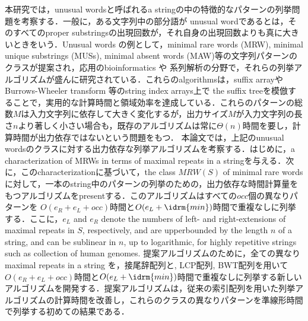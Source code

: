 
本研究では，unusual wordsと呼ばれるa stringの中の特徴的なパターンの列挙問題を考察する．一般に，ある文字列中の部分語が unusual wordであるとは，そのすべてのproper substringsの出現回数が，それ自身の出現回数よりも真に大きいときをいう．Unusual words の例として，minimal rare words (MRW), minimal unique substrings (MUSs), minimal absent words (MAW)等の文字列パターンのクラスが提案され，応用のbioinformatics や 系列解析の分野で，それらの列挙アルゴリズムが盛んに研究されている．これらのalgorithmsは，suffix arrayやBurrows-Wheeler transform 等のstring index arrays上で the suffix treeを模倣することで，実用的な計算時間と領域効率を達成している．これらのパターンの総数$M$は入力文字列に依存して大きく変化するが，出力サイズ$M$が入力文字列の長さ$n$より著しく小さい場合も，既存のアルゴリズムは常に$\Theta(n)$時間を要し，計算時間が出力依存ではないという問題をもつ．
本論文では，上記のunusual wordsのクラスに対する出力依存な列挙アルゴリズムを考察する．はじめに，a characterization of MRWs in terms of maximal repeats in a stringを与える．次に，このcharacterizationに基づいて，the class $MRW(S)$ of minimal rare wordsに対して，一本のstring中のパターンの列挙のための，出力依存な時間計算量をもつアルゴリズムをpresentする．このアルゴリズムはすべての$occ$個の異なりパターンを $O(e_R + e_L + occ)$時間と$O(e_L + \idrm{min})$時間で重複なしに列挙する．ここに，$e_L$ and $e_R$ denote the numbers of left- and right-extensions of maximal repeats in $S$, respectively, and are upperbounded by the length $n$ of a string, and can be sublinear in $n$, up to logarithmic, for highly repetitive strings such as collection of human genomes.
提案アルゴリズムのために，全ての異なり maximal repeats in a string を，接尾辞配列と, LCP配列, BWT配列を用いて $O(e_R + e_L + occ)$時間と$O(e_L + \idrm{min})$時間で重複なしに列挙する新しいアルゴリズムを開発する．提案アルゴリズムは，従来の索引配列を用いた列挙アルゴリズムの計算時間を改善し，これらのクラスの異なりパターンを準線形時間で列挙する初めての結果である．
